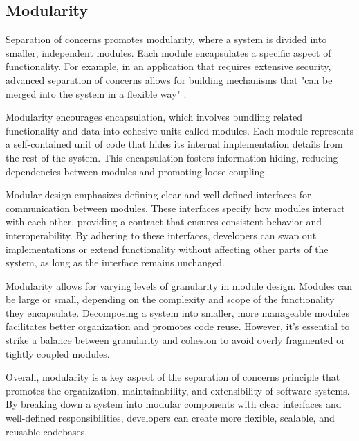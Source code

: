 \subsection{Modularity}
Separation of concerns promotes modularity, where a system is divided into smaller, independent modules.
Each module encapsulates a specific aspect of functionality.
For example, in an application that requires extensive security, 
advanced separation of concerns allows for building mechanisms that "can be merged into the system in a flexible way" \cite{socExample}.
\par
Modularity encourages encapsulation, which involves bundling related functionality and data into cohesive units called modules.
Each module represents a self-contained unit of code that hides its internal implementation details from the rest of the system.
This encapsulation fosters information hiding, reducing dependencies between modules and promoting loose coupling.
\par
Modular design emphasizes defining clear and well-defined interfaces for communication between modules.
These interfaces specify how modules interact with each other, providing a contract that ensures consistent behavior and interoperability.
By adhering to these interfaces, developers can swap out implementations or extend functionality without affecting other parts of the system, as long as the interface remains unchanged.
\par
Modularity allows for varying levels of granularity in module design.
Modules can be large or small, depending on the complexity and scope of the functionality they encapsulate.
Decomposing a system into smaller, more manageable modules facilitates better organization and promotes code reuse.
However, it's essential to strike a balance between granularity and cohesion to avoid overly fragmented or tightly coupled modules.
\par
Overall, modularity is a key aspect of the separation of concerns principle that promotes the organization, maintainability, and extensibility of software systems.
By breaking down a system into modular components with clear interfaces and well-defined responsibilities, developers can create more flexible, scalable, and reusable codebases.


